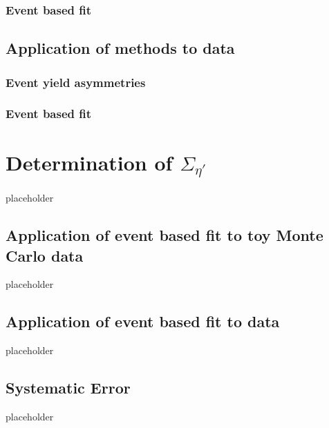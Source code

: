 \subsubsection{Event based fit}
\subsection{Application of methods to data}
\subsubsection{Event yield asymmetries}
\subsubsection{Event based fit}
\section{Determination of $\Sigma_{\eta'}$}
placeholder
\subsection{Application of event based fit to toy Monte Carlo data}
placeholder
\subsection{Application of event based fit to data}
placeholder
\subsection{Systematic Error}
placeholder